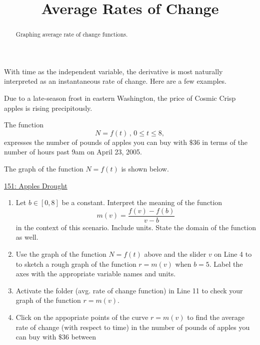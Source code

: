 \documentclass{ximera}
\title{Average Rates of Change}
\begin{document}
\begin{abstract}
Graphing average rate of change functions.
\end{abstract}
\maketitle


With time as the independent variable, the derivative is most naturally interpreted as an instantaneous rate of change. Here are a few examples. %

\begin{question}  \label{Q4ghg5df5yhhfg4tr4}
Due to a late-season frost in eastern Washington, the price of Cosmic Crisp apples is rising precipitously.

The function
\[
      N = f(t)  \, , \, 0\leq t \leq 8 ,                     %
\]
expresses the number of pounds of apples you can buy with $\$36$ in terms of the number of hours past 9am on April 23, 2005. 

The graph of the function $N=f(t)$ is shown below.

\begin{onlineOnly}
    \begin{center}
\end{center}
\end{onlineOnly}

\href{https://www.desmos.com/calculator/njanpkrqex}{151: Apples Drought}

\begin{enumerate}

\item Let $b\in [0,8]$ be a constant. Interpret the meaning of the function
\[
   m(v) =  \frac{f(v)-f(b)}{v-b}
\]
in the context of this scenario. Include units. State the domain of the function as well.

\item Use the graph of the function $N=f(t)$ above and the slider $v$ on Line 4 to to sketch a rough graph of the function $r=m(v)$ when $b=5$. Label the axes with the appropriate variable names and units.

\item Activate the folder (avg. rate of change function) in Line 11 to check your graph of the function $r=m(v)$. 

\item Click on the appopriate points of the curve $r=m(v)$ to find the average rate of change (with respect to time) in the number of pounds of apples you can buy with $\$36$ between 


\end{enumerate}
\end{question}
\end{document}
